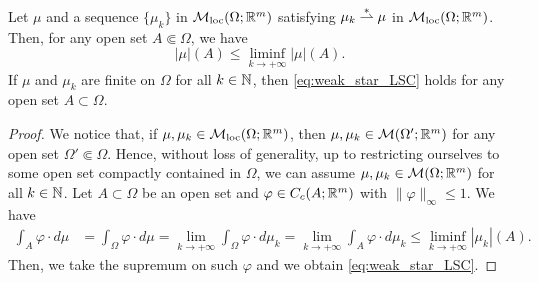 \begin{proposition} \label{prop:weak_star_LSC}
Let $\mu$ and a sequence $\{\mu_{k}\}$ in $\mathcal{M}_{\rm loc}(\Omega; \mathbb{R}^{m})$ satisfying $\mu_{k} \overset{*}{\rightharpoonup} \mu$ in $\mathcal{M}_{\rm loc}(\Omega; \mathbb{R}^{m})$. Then, for any open set $A \Subset \Omega$, we have
\begin{equation} \label{eq:weak_star_LSC}
|\mu|(A) \le \liminf_{k \to + \infty} |\mu|(A).
\end{equation}
If $\mu$ and $\mu_{k}$ are finite on $\Omega$ for all $k \in \mathbb{N}$, then \eqref{eq:weak_star_LSC} holds for any open set $A \subset \Omega$.
\end{proposition}
\begin{proof}
We notice that, if $\mu, \mu_{k} \in \mathcal{M}_{\rm loc}(\Omega; \mathbb{R}^{m})$, then $\mu, \mu_{k} \in \mathcal{M}(\Omega'; \mathbb{R}^{m})$ for any open set $\Omega' \Subset \Omega$. Hence, without loss of generality, up to restricting ourselves to some open set compactly contained in $\Omega$, we can assume $\mu, \mu_{k} \in \mathcal{M}(\Omega; \mathbb{R}^{m})$ for all $k \in \mathbb{N}$.
Let $A \subset \Omega$ be an open set and $\varphi \in C_{c}(A; \mathbb{R}^{m})$ with $\|\varphi\|_{\infty} \le 1$. We have
\begin{align*}
\int_{A} \varphi \cdot d \mu & = \int_{\Omega} \varphi \cdot d \mu = \lim_{k \to + \infty} \int_{\Omega} \varphi \cdot d \mu_{k} = \lim_{k \to + \infty} \int_{A} \varphi \cdot d \mu_{k} \le \liminf_{k \to + \infty} |\mu_{k}|(A).
\end{align*}
Then, we take the supremum on such $\varphi$ and we obtain \eqref{eq:weak_star_LSC}.
\end{proof}

